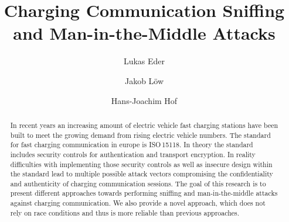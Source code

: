 \documentclass[sigconf]{acmart}
\begin{document}
\title{Charging Communication Sniffing and Man-in-the-Middle Attacks}




\author{Lukas Eder}

\author{Jakob L\"{o}w}
\authornotemark[1]

\author{Hans-Joachim Hof}








\renewcommand{\shortauthors}{Eder and Loew et al.}

\begin{abstract}
In recent years an increasing amount of electric vehicle fast charging stations have been built to meet the growing demand from rising electric vehicle numbers.
The standard for fast charging communication in europe is ISO\,15118.
In theory the standard includes security controls for authentication and transport encryption.
In reality difficulties with implementing those security controls as well as insecure design within the standard lead to multiple possible attack vectors compromising the confidentiality and authenticity of charging communication sessions.
The goal of this research is to present different approaches towards performing sniffing and man-in-the-middle attacks against charging communication.
We also provide a novel approach, which does not rely on race conditions and thus is more reliable than previous approaches.
\end{abstract}
\end{document}
